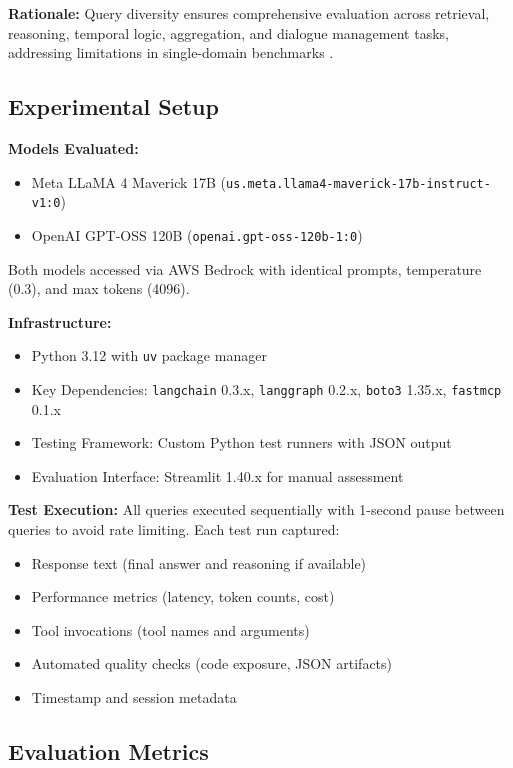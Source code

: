 \documentclass{article}
\begin{document}
\textbf{Rationale:} Query diversity ensures comprehensive evaluation across retrieval, reasoning, temporal logic, aggregation, and dialogue management tasks, addressing limitations in single-domain benchmarks \cite{wang2025megaagent}.

\subsection{Experimental Setup}

\textbf{Models Evaluated:}
\begin{itemize}
    \item Meta LLaMA 4 Maverick 17B (\texttt{us.meta.llama4-maverick-17b-instruct-v1:0})
    \item OpenAI GPT-OSS 120B (\texttt{openai.gpt-oss-120b-1:0})
\end{itemize}

Both models accessed via AWS Bedrock with identical prompts, temperature (0.3), and max tokens (4096).

\textbf{Infrastructure:}
\begin{itemize}
    \item Python 3.12 with \texttt{uv} package manager
    \item Key Dependencies: \texttt{langchain} 0.3.x, \texttt{langgraph} 0.2.x, \texttt{boto3} 1.35.x, \texttt{fastmcp} 0.1.x
    \item Testing Framework: Custom Python test runners with JSON output
    \item Evaluation Interface: Streamlit 1.40.x for manual assessment
\end{itemize}

\textbf{Test Execution:} All queries executed sequentially with 1-second pause between queries to avoid rate limiting. Each test run captured:
\begin{itemize}
    \item Response text (final answer and reasoning if available)
    \item Performance metrics (latency, token counts, cost)
    \item Tool invocations (tool names and arguments)
    \item Automated quality checks (code exposure, JSON artifacts)
    \item Timestamp and session metadata
\end{itemize}

\subsection{Evaluation Metrics}
\end{document}
